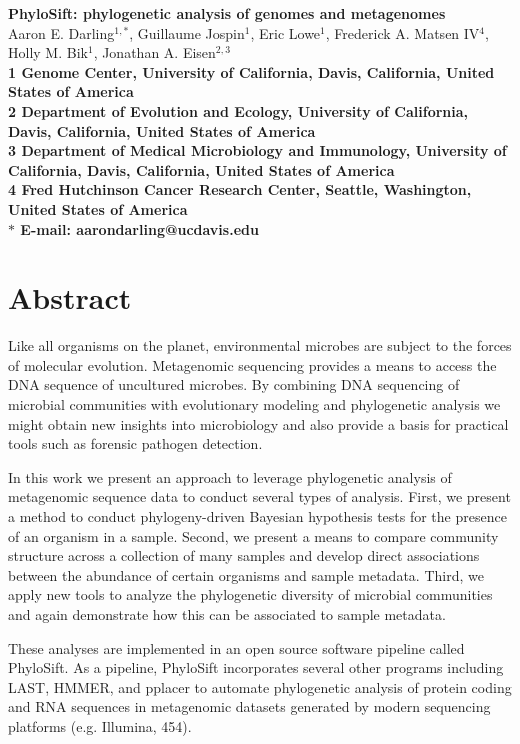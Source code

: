 \documentclass[10pt]{article}
\date{}
\begin{document}
\begin{flushleft}
{\Large
\textbf{PhyloSift: phylogenetic analysis of genomes and metagenomes}
}
\\
Aaron E. Darling$^{1,\ast}$,
Guillaume Jospin$^{1}$,
Eric Lowe$^{1}$,
Frederick A. Matsen IV$^{4}$,
Holly M. Bik$^{1}$,
Jonathan A. Eisen$^{2,3}$
\\
\bf{1} Genome Center, University of California, Davis, California, United States of America
\\
\bf{2} Department of Evolution and Ecology, University of California, Davis, California, United States of America
\\
\bf{3} Department of Medical Microbiology and Immunology, University of California, Davis, California, United States of America
\\
\bf{4} Fred Hutchinson Cancer Research Center, Seattle, Washington, United States of America
\\
$\ast$ E-mail: aarondarling@ucdavis.edu
\end{flushleft}

\section*{Abstract}
Like all organisms on the planet, environmental microbes are subject to the forces of molecular evolution.
Metagenomic sequencing provides a means to access the DNA sequence of uncultured microbes.
By combining DNA sequencing of microbial communities with evolutionary modeling and phylogenetic analysis we might obtain new insights into microbiology and also provide a basis for practical tools such as forensic pathogen detection.

In this work we present an approach to leverage phylogenetic analysis of metagenomic sequence data to conduct several types of analysis.
First, we present a method to conduct phylogeny-driven Bayesian hypothesis tests for the presence of an organism in a sample.
Second, we present a means to compare community structure across a collection of many samples and develop direct associations between the abundance of certain organisms and sample metadata.
Third, we apply new tools to analyze the phylogenetic diversity of microbial communities and again demonstrate how this can be associated to sample metadata.

These analyses are implemented in an open source software pipeline called PhyloSift.
As a pipeline, PhyloSift incorporates several other programs including LAST, HMMER, and pplacer to automate phylogenetic analysis of protein coding and RNA sequences in metagenomic datasets generated by modern sequencing platforms (e.g. Illumina, 454).
\end{document}
